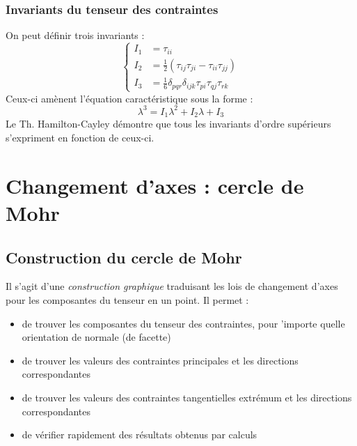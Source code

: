         \subsubsection{Invariants du tenseur des contraintes}
        On peut définir trois invariants :
        \begin{equation}
        \left\{\begin{array}{ll}
        I_1 &= \tau_{ii} \\
        I_2 &= \frac{1}{2} (\tau_{ij}\tau_{ji} - \tau_{ii}\tau_{jj})\\
        I_3 &= \frac{1}{6}\delta_{pqr}\delta_{ijk}\tau_{pi}\tau_{qj}\tau_{rk}
        \end{array}\right.
        \end{equation}
        Ceux-ci amènent l'équation caractéristique sous la forme :
        \begin{equation}
        \lambda^3 = I_1 \lambda^2 + I_2 \lambda + I_3
        \end{equation}
        Le Th. Hamilton-Cayley démontre que tous les invariants d'ordre supérieurs s'expriment en fonction
        de ceux-ci.
    

\section{Changement d'axes : cercle de Mohr}
    \subsection{Construction du cercle de Mohr}
    Il s'agit d'une \textit{construction graphique} traduisant les lois de changement d'axes pour les 
    composantes du tenseur en un point. Il permet :
    \begin{itemize}
    \item de trouver les composantes du tenseur des contraintes, pour 'importe quelle orientation de
    normale (de facette)
    \item de trouver les valeurs des contraintes principales et les  directions correspondantes
    \item de trouver les valeurs des contraintes tangentielles extrémum et les directions 
    correspondantes
    \item de vérifier rapidement des résultats obtenus par calculs
    \end{itemize}
    

